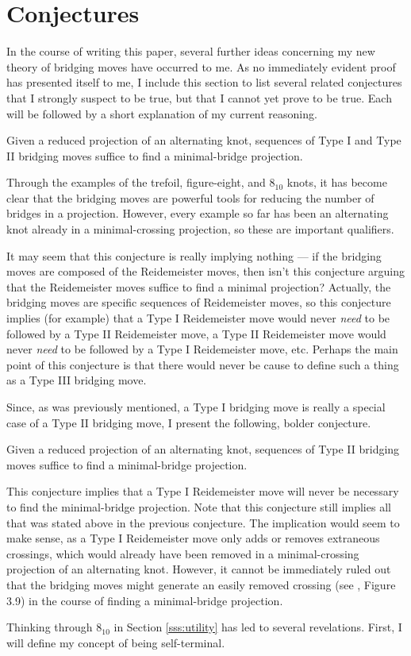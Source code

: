 \documentclass[titlepage,11pt]{article}
\begin{document}
\section{Conjectures}
In the course of writing this paper, several further ideas concerning my new theory of bridging moves have occurred to me. As no immediately evident proof has presented itself to me, I include this section to list several related conjectures that I strongly suspect to be true, but that I cannot yet prove to be true. Each will be followed by a short explanation of my current reasoning.

\begin{conj}
    Given a reduced projection of an alternating knot, sequences of Type I and Type II bridging moves suffice to find a minimal-bridge projection.
\end{conj}

Through the examples of the trefoil, figure-eight, and $8_{10}$ knots, it has become clear that the bridging moves are powerful tools for reducing the number of bridges in a projection. However, every example so far has been an alternating knot already in a minimal-crossing projection, so these are important qualifiers.\par
It may seem that this conjecture is really implying nothing --- if the bridging moves are composed of the Reidemeister moves, then isn't this conjecture arguing that the Reidemeister moves suffice to find a minimal projection? Actually, the bridging moves are specific sequences of Reidemeister moves, so this conjecture implies (for example) that a Type I Reidemeister move would never \emph{need} to be followed by a Type II Reidemeister move, a Type II Reidemeister move would never \emph{need} to be followed by a Type I Reidemeister move, etc. Perhaps the main point of this conjecture is that there would never be cause to define such a thing as a Type III bridging move.\par
Since, as was previously mentioned, a Type I bridging move is really a special case of a Type II bridging move, I present the following, bolder conjecture.

\begin{conj}
    Given a reduced projection of an alternating knot, sequences of Type II bridging moves suffice to find a minimal-bridge projection.
\end{conj}

This conjecture implies that a Type I Reidemeister move will never be necessary to find the minimal-bridge projection. Note that this conjecture still implies all that was stated above in the previous conjecture. The implication would seem to make sense, as a Type I Reidemeister move only adds or removes extraneous crossings, which would already have been removed in a minimal-crossing projection of an alternating knot. However, it cannot be immediately ruled out that the bridging moves might generate an easily removed crossing (see \cite{bib:knotnotes}, Figure 3.9) in the course of finding a minimal-bridge projection.\par
Thinking through $8_{10}$ in Section \ref{sss:utility} has led to several revelations. First, I will define my concept of being self-terminal.
\end{document}

